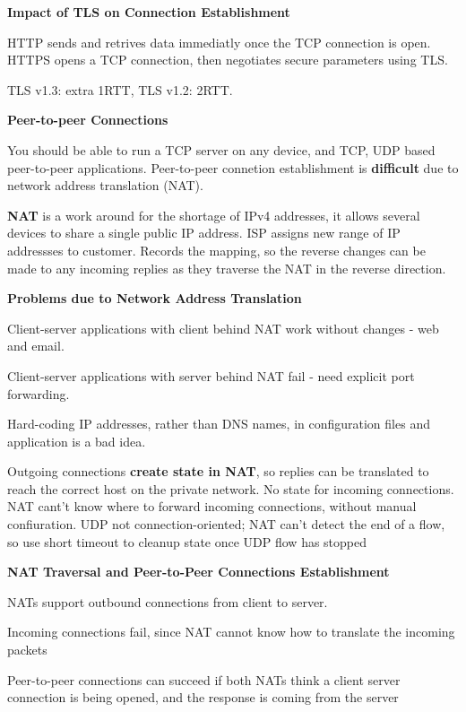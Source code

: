 \documentclass{article}
\begin{document}
\vspace{\baselineskip}
\textbf{Impact of TLS on Connection Establishment}

HTTP sends and retrives data immediatly once the TCP connection is open.
HTTPS opens a TCP connection, then negotiates secure parameters using TLS.\@

TLS v1.3: extra 1RTT, TLS v1.2: 2RTT.\@

\vspace{\baselineskip}
\textbf{Peer-to-peer Connections}

You should be able to run a TCP server on any device, and TCP, UDP based peer-to-peer applications.
Peer-to-peer connetion establishment is \textbf{difficult} due to network address translation (NAT).

\textbf{NAT} is a work around for the shortage of IPv4 addresses, it allows several devices to share a single public IP address.
ISP assigns new range of IP addressses to customer.
Records the mapping, so the reverse changes can be made to any incoming replies as they traverse the NAT in the reverse direction.

\vspace{\baselineskip}
\textbf{Problems due to Network Address Translation}

Client-server applications with client behind NAT work without changes {-} web and email.

Client-server applications with server behind NAT fail {-} need explicit port forwarding.

Hard-coding IP addresses, rather than DNS names, in configuration files and application is a bad idea.

Outgoing connections \textbf{create state in NAT}, so replies can be translated to reach the correct host on the private network.
No state for incoming connections. NAT cant't know where to forward incoming connections, without manual confiuration.
UDP not connection-oriented; NAT can't detect the end of a flow, so use short timeout to cleanup state once UDP flow has stopped

\vspace{\baselineskip}
\textbf{NAT Traversal and Peer-to-Peer Connections Establishment}

NATs support outbound connections from client to server.

Incoming connections fail, since NAT cannot know how to translate the incoming packets

Peer-to-peer connections can succeed if both NATs think a client server connection is being opened, and the response is coming from the server
\end{document}

